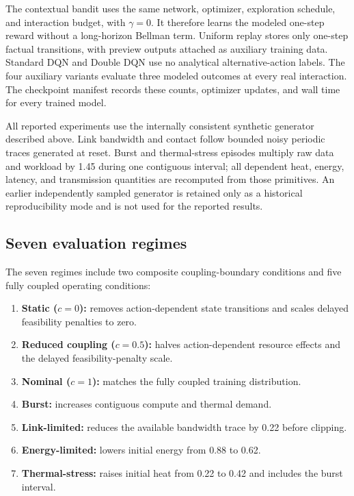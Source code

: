 \documentclass[11pt]{article}
\begin{document}
The contextual bandit uses the same network, optimizer, exploration schedule, and interaction budget, with $\gamma=0$. It therefore learns the modeled one-step reward without a long-horizon Bellman term. Uniform replay stores only one-step factual transitions, with preview outputs attached as auxiliary training data. Standard DQN and Double DQN use no analytical alternative-action labels. The four auxiliary variants evaluate three modeled outcomes at every real interaction. The checkpoint manifest records these counts, optimizer updates, and wall time for every trained model.

All reported experiments use the internally consistent synthetic generator described above. Link bandwidth and contact follow bounded noisy periodic traces generated at reset. Burst and thermal-stress episodes multiply raw data and workload by 1.45 during one contiguous interval; all dependent heat, energy, latency, and transmission quantities are recomputed from those primitives. An earlier independently sampled generator is retained only as a historical reproducibility mode and is not used for the reported results.

\subsection{Seven evaluation regimes}

The seven regimes include two composite coupling-boundary conditions and five fully coupled operating conditions:

\begin{enumerate}[leftmargin=1.6em]
    \item \textbf{Static ($c=0$):} removes action-dependent state transitions and scales delayed feasibility penalties to zero.
    \item \textbf{Reduced coupling ($c=0.5$):} halves action-dependent resource effects and the delayed feasibility-penalty scale.
    \item \textbf{Nominal ($c=1$):} matches the fully coupled training distribution.
    \item \textbf{Burst:} increases contiguous compute and thermal demand.
    \item \textbf{Link-limited:} reduces the available bandwidth trace by 0.22 before clipping.
    \item \textbf{Energy-limited:} lowers initial energy from 0.88 to 0.62.
    \item \textbf{Thermal-stress:} raises initial heat from 0.22 to 0.42 and includes the burst interval.
\end{enumerate}
\end{document}
